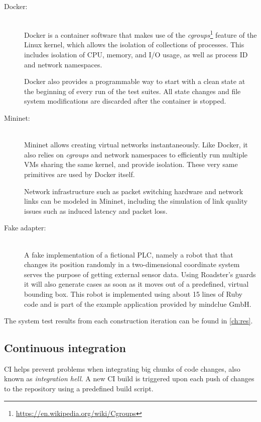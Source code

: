 \begin{description}
	\item [Docker:]\hfill\\
		Docker is a container software that makes use of the
		\emph{cgroups}\footnote{\url{https://en.wikipedia.org/wiki/Cgroups}}
		feature of the Linux kernel, which allows the isolation of
		collections of processes. This includes isolation of CPU,
		memory, and I/O usage, as well as process ID and network
		namespaces.

		Docker also provides a programmable way to start with a clean
		state at the beginning of every run of the test suites. All
		state changes and file system modifications are discarded after
		the container is stopped.

	\item [Mininet:]\hfill\\
		Mininet allows creating virtual networks instantaneously.
		Like Docker, it also relies on \emph{cgroups}
		and network namespaces to efficiently run multiple \glspl{VM}
		sharing the same kernel, and provide isolation. These very same
		primitives are used by Docker itself.

		Network infrastructure such as packet switching hardware and
		network links can be modeled in Mininet, including the
		simulation of link quality issues such as induced latency and
		packet loss.

	\item [Fake adapter:]\hfill\\
		A fake implementation of a fictional \gls{PLC}, namely a robot
		that that changes its position randomly in a two-dimensional coordinate
		system serves the purpose of getting external sensor data.
		Using Roadster's guards it will also generate cases as soon as
		it moves out of a predefined, virtual bounding box. This robot
		is implemented using about 15 lines of Ruby code and is part of
		the example application provided by mindclue GmbH.
\end{description}

The system test results from each construction iteration can be found in \autoref{ch:res}.


\subsection{Continuous integration}
\Gls{CI} helps prevent problems when integrating big chunks of code changes,
also known as \emph{integration hell}. A new CI build is triggered upon each
push of changes to the repository using a predefined build script.

